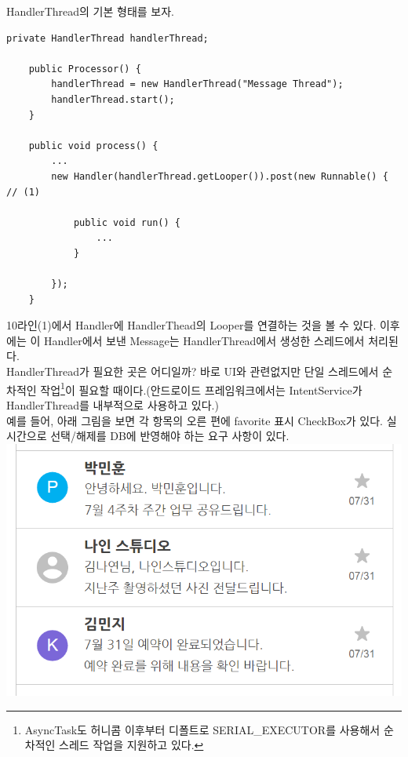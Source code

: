 HandlerThread의 기본 형태를 보자.
\begin{lstlisting}[frame=single] 
	private HandlerThread handlerThread;
	
	public Processor() {
		handlerThread = new HandlerThread("Message Thread");
		handlerThread.start();
	}
	
	public void process() {
		...
		new Handler(handlerThread.getLooper()).post(new Runnable() {  // (1)
		
			public void run() {
				...
			}
			
		});
	}
\end{lstlisting}
10라인(1)에서 Handler에 HandlerThead의 Looper를 연결하는 것을 볼 수 있다. 이후에는 이 Handler에서 보낸 Message는 HandlerThread에서 생성한 스레드에서 처리된다.\\

HandlerThread가 필요한 곳은 어디일까? 
바로 UI와 관련없지만 단일 스레드에서 순차적인 작업\footnote{AsyncTask도  허니콤 이후부터 디폴트로 SERIAL\_EXECUTOR를 사용해서 순차적인 스레드 작업을 지원하고 있다.}이 필요할 때이다.(안드로이드 프레임워크에서는 IntentService가 HandlerThread를 내부적으로 사용하고 있다.)\\

예를 들어, 아래 그림을 보면 각 항목의 오른 편에 favorite 표시 CheckBox가 있다.
실시간으로 선택/해제를 DB에 반영해야 하는 요구 사항이 있다.\\
\includegraphics[scale=0.65]{favorite_sample}

